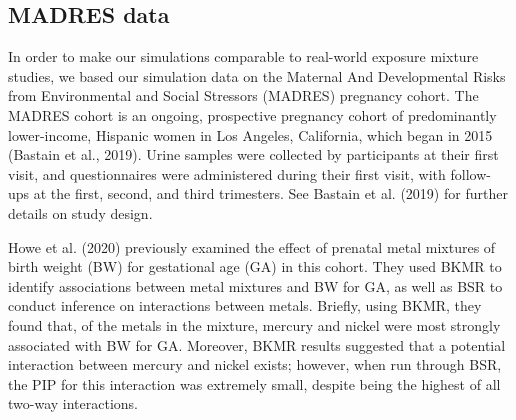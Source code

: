 \documentclass[12pt, twoside]{amherstthesis}
\begin{document}
\hypertarget{madres}{%
\subsection{MADRES data}\label{madres}}

In order to make our simulations comparable to real-world exposure mixture studies, we based our simulation data on the Maternal And Developmental Risks from Environmental and Social Stressors (MADRES) pregnancy cohort. The MADRES cohort is an ongoing, prospective pregnancy cohort of predominantly lower-income, Hispanic women in Los Angeles, California, which began in 2015 (Bastain et al., 2019). Urine samples were collected by participants at their first visit, and questionnaires were administered during their first visit, with follow-ups at the first, second, and third trimesters. See Bastain et al. (2019) for further details on study design.

Howe et al. (2020) previously examined the effect of prenatal metal mixtures of birth weight (BW) for gestational age (GA) in this cohort. They used BKMR to identify associations between metal mixtures and BW for GA, as well as BSR to conduct inference on interactions between metals. Briefly, using BKMR, they found that, of the metals in the mixture, mercury and nickel were most strongly associated with BW for GA. Moreover, BKMR results suggested that a potential interaction between mercury and nickel exists; however, when run through BSR, the PIP for this interaction was extremely small, despite being the highest of all two-way interactions.
\end{document}

